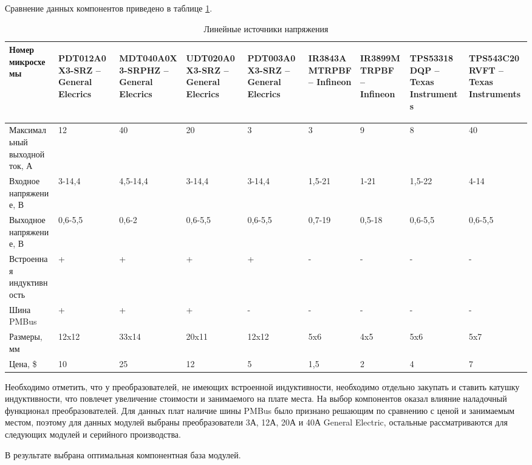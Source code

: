 Сравнение данных компонентов приведено в таблице \ref{impulse-onephase-power}.
\begin{table}[H]
	\caption{Линейные источники напряжения}\label{impulse-onephase-power}
	\begin{tabular}{|p{}|l|l|l|l|l|l|l|l|}
		\hline Номер микросхемы & 
	\begin{sideways} PDT012A0X3-SRZ -- General Elecrics \end{sideways} & 
		\begin{sideways} MDT040A0X3-SRPHZ -- General Elecrics \end{sideways} &
		\begin{sideways} UDT020A0X3-SRZ -- General Elecrics \end{sideways} &
		\begin{sideways} PDT003A0X3-SRZ -- General Elecrics \end{sideways} &
		\begin{sideways} IR3843AMTRPBF -- Infineon \end{sideways} &
		\begin{sideways} IR3899MTRPBF -- Infineon \end{sideways} &
		\begin{sideways} TPS53318DQP -- Texas Instruments \end{sideways} &
		\begin{sideways} TPS543C20RVFT -- Texas Instruments \end{sideways}   \\
		\hline Максимальный выходной ток, А & 12 & 40 & 20 & 3 & 3 & 9 & 8 & 40 \\
		\hline Входное напряжение, В & 3-14,4 & 4,5-14,4 & 3-14,4 & 3-14,4 & 1,5-21 & 1-21 & 1,5-22 & 4-14 \\
		\hline Выходное напряжение, В & 0,6-5,5 & 0,6-2 & 0,6-5,5 & 0,6-5,5 & 0,7-19 & 0,5-18 & 0,6-5,5 & 0,6-5,5 \\
		\hline Встроенная индуктивность& + & + & + & + & - & - & - & - \\
		\hline Шина PMBus & + & + & + & - & - & - & - & - \\
		\hline Размеры, мм & 12x12 & 33x14 & 20x11 & 12x12 & 5x6 & 4x5 & 5x6 & 5x7 \\
		\hline Цена, \$ & 10 & 25 & 12 & 5 & 1,5 & 2 & 4 & 7 \\
		\hline 
	\end{tabular}
\end{table}

Необходимо отметить, что у преобразователей, не имеющих встроенной индуктивности, необходимо отдельно закупать и ставить катушку индуктивности, что повлечет увеличение стоимости и занимаемого на плате места. На выбор компонентов оказал влияние наладочный функционал преобразователей. Для данных плат наличие шины PMBus было признано решающим по сравнению с ценой и занимаемым местом, поэтому для данных модулей выбраны преобразователи 3А, 12А, 20А и 40А General Electric, остальные рассматриваются для следующих модулей и серийного производства. 

В результате выбрана оптимальная компонентная база модулей.

\clearpage
